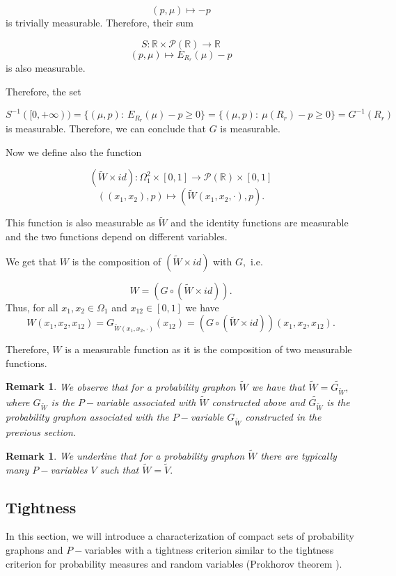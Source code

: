 \documentclass[11pt]{article}
\newtheorem{remark}[theorem]{Remark}
\def\R{\mathbb{R}}
\begin{document}
$$
(p,\mu)\mapsto -p
$$
is trivially measurable. Therefore, their sum 

$$
S:\R \times \mathcal{P}(\R) \rightarrow \R$$
$$
(p,\mu)\mapsto E_{R_r}(\mu)-p
$$
is also measurable.


Therefore, the set 

$$
S^{-1}([0,+\infty))=\{(\mu,p):\ E_{R_r}(\mu)-p\geq 0\}=\{(\mu,p):\ \mu(R_r)-p\geq 0\}=G^{-1}(R_r)$$
is measurable. Therefore, we can conclude that $G$ is measurable.


Now we define also the function 

$$
(\widetilde W \times id):\Omega_1^2\times [0,1]\rightarrow \mathcal{P}(\R)\times [0,1]
$$
$$
((x_1,x_2),p)\mapsto (\widetilde W(x_1,x_2,\cdot),p).
$$

This function is also measurable as $\widetilde W$ and the identity functions are measurable and the two functions depend on different variables.

We get that $W$ is the composition of $(\widetilde W \times id)$ with $G,$ i.e.\ 

$$
W=(G\circ (\widetilde W \times id)).$$
Thus, for all $x_1,x_2\in \Omega_1$ and $x_{12}\in [0,1]$ we have
$$W(x_1,x_2,x_{12})=G_{\widetilde W(x_1,x_2,\cdot)}(x_{12})=(G\circ (\widetilde W \times id))(x_1,x_2,x_{12}).$$

Therefore, $W$ is a measurable function as it is the composition of two measurable functions.
\endproof

\begin{remark}
    We observe that for a probability graphon $\widetilde W$  we have that $\widetilde W=\widetilde{G_{\widetilde W}},$ where $G_{\widetilde W}$ is the $P-$variable associated with $\widetilde W$ constructed above and $\widetilde{G_{\widetilde W}}$ is the probability graphon associated with the $P-$variable $G_{\widetilde W}$ constructed in the previous section.
\end{remark}


\begin{remark}
We underline that for a probability graphon $\widetilde W$ there are typically many $P-$variables $V$ such that $\widetilde W=\widetilde V.$ 
\end{remark}


\subsection{Tightness}
In this section, we will introduce a characterization of compact sets of probability graphons and $P-$variables with a tightness criterion similar to the tightness criterion for probability measures and random variables (Prokhorov theorem \cite[Theorem 5.1]{billingsley1968convergence}).
\end{document}
